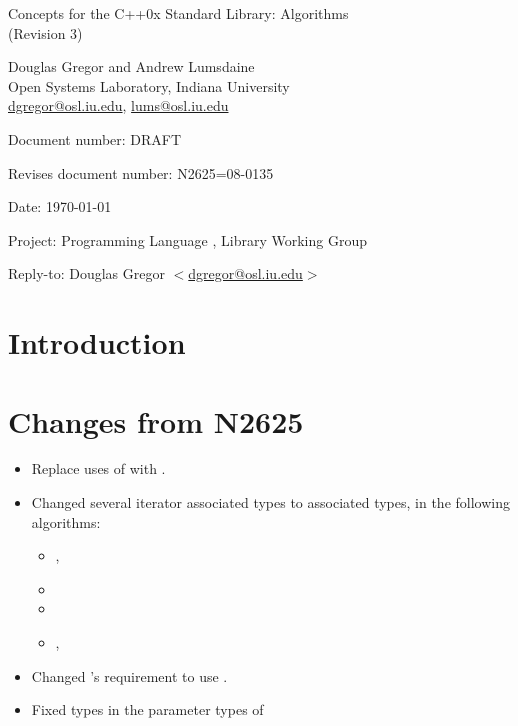 \documentclass[american,twoside]{book}
\begin{document}
\raggedbottom

\begin{titlepage}
\begin{center}
\huge
Concepts for the C++0x Standard Library: Algorithms \\
(Revision 3)

\vspace{0.5in}

\normalsize
Douglas Gregor and Andrew Lumsdaine \\
Open Systems Laboratory, Indiana University \\
\href{mailto:dgregor@osl.iu.edu}{dgregor@osl.iu.edu}, \href{mailto:lums@osl.iu.edu}{lums@osl.iu.edu}
\end{center}

\vspace{1in}
\par\noindent Document number: DRAFT\vspace{-6pt}
\par\noindent Revises document number: N2625=08-0135\vspace{-6pt}
\par\noindent Date: \today\vspace{-6pt}
\par\noindent Project: Programming Language \Cpp{}, Library Working Group\vspace{-6pt}
\par\noindent Reply-to: Douglas Gregor $<$\href{mailto:dgregor@osl.iu.edu}{dgregor@osl.iu.edu}$>$\vspace{-6pt}

\section*{Introduction}
\section*{Changes from N2625}
\begin{itemize}
\item Replace uses of  with .
\item Changed several iterator  associated types to  associated types, in the following algorithms:
  \begin{itemize}
  \item {}, 
  \item {}
  \item {}
  \item {}, 
  \end{itemize}
\item Changed 's  requirement
  to use . 
\item Fixed types in the parameter types of 
\end{itemize}

\end{titlepage}
\end{document}
